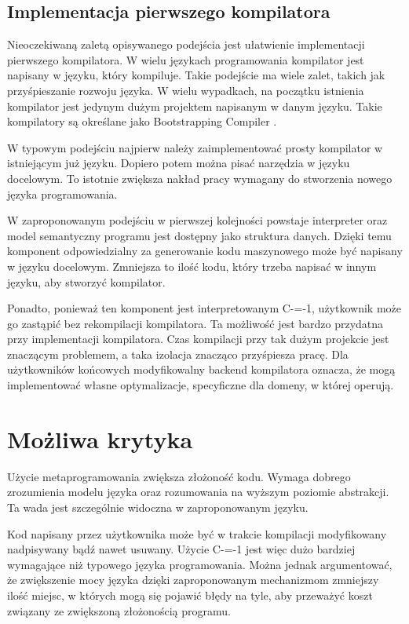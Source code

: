 \documentclass[conference]{IEEEtran}
\begin{document}
\subsection{Implementacja pierwszego kompilatora}

Nieoczekiwaną zaletą opisywanego podejścia jest ułatwienie implementacji pierwszego kompilatora.
W wielu językach programowania kompilator jest napisany w języku, który kompiluje.
Takie podejście ma wiele zalet, takich jak przyśpieszanie rozwoju języka.
W wielu wypadkach, na początku istnienia kompilator jest jedynym dużym projektem napisanym w danym języku.
Takie kompilatory są określane jako Bootstrapping Compiler \cite{b1}\cite{bootstrap1}.

W typowym podejściu najpierw należy zaimplementować prosty kompilator w istniejącym już języku. 
Dopiero potem można pisać narzędzia w języku docelowym.
To istotnie zwiększa nakład pracy wymagany do stworzenia nowego języka programowania. 

W zaproponowanym podejściu w pierwszej kolejności powstaje interpreter oraz model semantyczny programu jest dostępny jako struktura danych.
Dzięki temu komponent odpowiedzialny za generowanie kodu maszynowego może być napisany w języku docelowym.
Zmniejsza to ilość kodu, który trzeba napisać w innym języku, aby stworzyć kompilator.

Ponadto, ponieważ ten komponent jest interpretowanym C-=-1, użytkownik może go zastąpić bez rekompilacji kompilatora.
Ta możliwość jest bardzo przydatna przy implementacji kompilatora.
Czas kompilacji przy tak dużym projekcie jest znaczącym problemem, a taka izolacja znacząco przyśpiesza pracę.
Dla użytkowników końcowych modyfikowalny backend kompilatora oznacza, że mogą implementować własne optymalizacje, specyficzne dla domeny, w której operują.

\section{Możliwa krytyka}

Użycie metaprogramowania zwiększa złożoność kodu.
Wymaga dobrego zrozumienia modelu języka oraz rozumowania na wyższym poziomie abstrakcji.
Ta wada jest szczególnie widoczna w zaproponowanym języku.

Kod napisany przez użytkownika może być w trakcie kompilacji modyfikowany nadpisywany bądź nawet usuwany.
Użycie C-=-1 jest więc dużo bardziej wymagające niż typowego języka programowania.
Można jednak argumentować, że zwiększenie mocy języka dzięki zaproponowanym mechanizmom zmniejszy ilość miejsc, w których mogą się pojawić błędy na tyle, aby przeważyć koszt związany ze zwiększoną złożonością programu.
\end{document}
